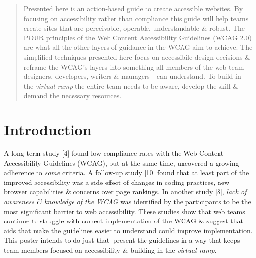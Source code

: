 \documentclass{acm_proc_article-sp}
\begin{document}
\maketitle
\begin{abstract}
Presented here is an action-based guide to create accessible websites. By focusing on accessibility rather than compliance this guide will help teams create sites that are perceivable, operable, understandable \& robust. The POUR principles of the Web Content Accessibility Guidelines (WCAG 2.0) are what all the other layers of guidance in the WCAG aim to achieve. The simplified techniques presented here focus on accessibile design decisions \& reframe the WCAG's layers into something all members of the web team - designers, developers, writers \& managers - can understand. To build in the \textit{virtual ramp} the entire team needs to be aware, develop the skill \& demand the necessary resources.

\end{abstract}



\section{Introduction}
A long term study [4] found low compliance rates with the Web Content Accessibility Guidelines (WCAG), but at the same time, uncovered a growing adherence to \textit{some} criteria. A follow-up study [10] found that at least part of the improved accessibility was a side effect of changes in coding practices, new browser capabilities \& concerns over page rankings. In another study [8], \textit{lack of awareness \& knowledge of the WCAG} was identified by the participants to be the most significant barrier to web accessibility. These studies show that web teams continue to struggle with correct implementation of the WCAG \& suggest that aids that make the guidelines easier to understand could improve implementation. This poster intends to do just that, present the guidelines in a way that keeps team members focused on accessibility \& building in the \textit{virtual ramp}. 
\end{document}
